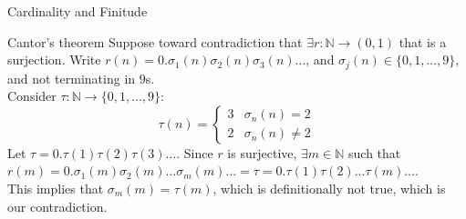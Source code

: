\documentclass[10pt]{extarticle}
\begin{document}
\begin{problem}{Cardinality and Finitude}
\begin{problem}{Cantor's theorem}
      Suppose toward contradiction that $\exists r:\mathbb{N} \rightarrow (0,1)$ that is a surjection. Write $r(n) = 0.\sigma_1(n)\sigma_2(n)\sigma_3(n)\dots$, and $\sigma_j(n) \in \{0,1,\dots,9\}$, and not terminating in $9$s.\\

      Consider $\tau: \mathbb{N} \rightarrow \{0,1,\dots,9\}$:
      \[
        \tau(n) = \begin{cases}
          3 & \sigma_n(n) = 2\\
          2 & \sigma_n(n) \neq 2
        \end{cases}
      \]
      Let $\tau = 0.\tau(1)\tau(2)\tau(3)\dots$. Since $r$ is surjective, $\exists m\in \mathbb{N}$ such that $r(m) = 0.\sigma_1(m)\sigma_2(m)\dots \sigma_m(m)\dots = \tau = 0.\tau(1)\tau(2)\dots\tau(m)\dots$.\\

      This implies that $\sigma_m(m) = \tau(m)$, which is definitionally not true, which is our contradiction.
    \end{problem}
  \end{problem}
\end{document}
